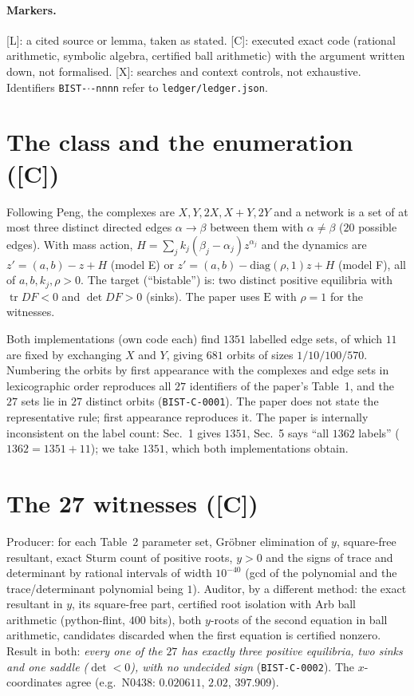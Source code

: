 \documentclass[10pt]{article}
\newcommand{\tier}[1]{\textsf{[#1]}}
\newcommand{\tL}{\tier{L}}
\newcommand{\tC}{\tier{C}}
\newcommand{\tX}{\tier{X}}
\begin{document}
\paragraph{Markers.} \tL{}: a cited source or lemma, taken as stated. \tC{}: executed exact code (rational arithmetic, symbolic algebra, certified ball arithmetic) with the argument written down, not formalised. \tX{}: searches and context controls, not exhaustive. Identifiers \texttt{BIST-$\cdot$-nnnn} refer to \texttt{ledger/ledger.json}.

\section{The class and the enumeration (\tC{})}\label{sec:enum}
Following Peng, the complexes are $X,Y,2X,X+Y,2Y$ and a network is a set of at most three distinct directed edges $\alpha\to\beta$ between them with $\alpha\ne\beta$ ($20$ possible edges). With mass action, $H=\sum_j k_j(\beta_j-\alpha_j)z^{\alpha_j}$ and the dynamics are
$z'=(a,b)-z+H$ (model E) or $z'=(a,b)-\mathrm{diag}(\rho,1)z+H$ (model F), all of $a,b,k_j,\rho>0$. The target (``bistable'') is: two distinct positive equilibria with $\operatorname{tr}DF<0$ and $\det DF>0$ (sinks). The paper uses $\mathrm{E}$ with $\rho=1$ for the witnesses.

Both implementations (own code each) find $1351$ labelled edge sets, of which $11$ are fixed by exchanging $X$ and $Y$, giving $681$ orbits of sizes $1/10/100/570$. Numbering the orbits by first appearance with the complexes and edge sets in lexicographic order reproduces all $27$ identifiers of the paper's Table~1, and the $27$ sets lie in $27$ distinct orbits (\texttt{BIST-C-0001}). The paper does not state the representative rule; first appearance reproduces it. The paper is internally inconsistent on the label count: Sec.~1 gives $1351$, Sec.~5 says ``all $1362$ labels'' ($1362=1351+11$); we take $1351$, which both implementations obtain.

\section{The 27 witnesses (\tC{})}\label{sec:wit}
Producer: for each Table~2 parameter set, Gr\"obner elimination of $y$, square-free resultant, exact Sturm count of positive roots, $y>0$ and the signs of trace and determinant by rational intervals of width $10^{-40}$ (gcd of the polynomial and the trace/determinant polynomial being $1$). Auditor, by a different method: the exact resultant in $y$, its square-free part, certified root isolation with Arb ball arithmetic (python-flint, $400$ bits), both $y$-roots of the second equation in ball arithmetic, candidates discarded when the first equation is certified nonzero. Result in both: \emph{every one of the $27$ has exactly three positive equilibria, two sinks and one saddle ($\det<0$), with no undecided sign} (\texttt{BIST-C-0002}). The $x$-coordinates agree (e.g.\ N0438: $0.020611$, $2.02$, $397.909$).
\end{document}
